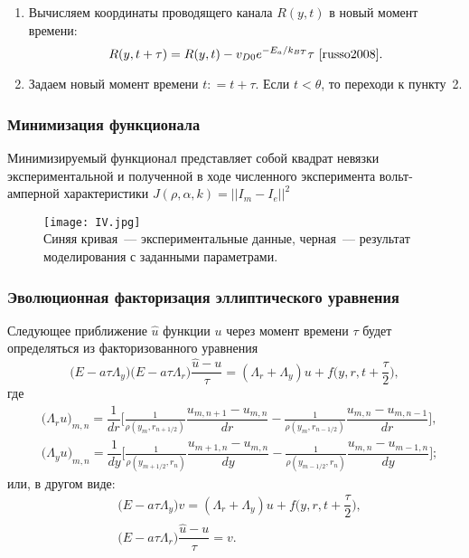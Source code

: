 \documentclass{beamer}
\begin{document}
\begin{frame}[allowframebreaks]
\begin{enumerate}
    \item Вычисляем координаты проводящего канала $R(y,t)$ в новый момент времени:
        \begin{equation*}
            R(y,t + \tau) = R(y,t) - v_{D0} e^{-E_a/{k}_{BT}} \tau~\cite{russo2008}.
        \end{equation*}

    \item Задаем новый момент времени $t: = t + \tau$. Если $t < \theta$, то переходи к пункту~2.

    \end{enumerate}
\end{frame}

\begin{frame}
    \frametitle{Минимизация функционала}
    Минимизируемый функционал представляет собой квадрат невязки экспериментальной и полученной в ходе численного эксперимента вольт-амперной характеристики $ J(\rho,\alpha,k) = || I_m - I_e||^2 $
    \begin{figure}
        \texttt{[image: IV.jpg]}
        \\ Синяя кривая~--- экспериментальные данные, черная~--- результат моделирования с заданными параметрами.
    \end{figure}
\end{frame}

\begin{frame}
    \frametitle{Эволюционная факторизация эллиптического уравнения}

    Следующее приближение $\hat{u}$ функции $u$ через момент времени $\tau$ будет определяться из  факторизованного уравнения~\cite{kalitkin}
    \begin{equation*}
        \Big(E - a\tau \Lambda_y\Big)\Big(E - a \tau \Lambda_r\Big)\dfrac{\hat{u} - u}{\tau} = (\Lambda_r + \Lambda_y) u + f\Big(y,r,t+\dfrac{\tau}{2}\Big),
    \end{equation*}
    где
    \begin{align*} &{\Big(\Lambda_r u\Big)}_{m,n} = \dfrac{1}{dr}\bigg[\frac{1}{\rho(y_{m},r_{n + 1/2})}\dfrac{u_{m,n + 1} - u_{m,n}}{dr} - \frac{1}{\rho(y_{m},r_{n - 1/2})}\dfrac{u_{m,n} - u_{m,n - 1}}{dr}\bigg], \\
    &{\Big(\Lambda_y u\Big)}_{m,n} = \dfrac{1}{dy}\bigg[\frac{1}{\rho(y_{m + 1/2},r_{n})}\dfrac{u_{m + 1,n} - u_{m,n}}{dy} - \frac{1}{\rho(y_{m - 1/2},r_{n})}\dfrac{u_{m,n} - u_{m - 1,n}}{dy}\bigg];
\end{align*}
или, в другом виде:
\begin{align*}
    &\Big(E - a\tau \Lambda_y\Big)v = (\Lambda_r + \Lambda_y) u + f\Big(y,r,t+\dfrac{\tau}{2}\Big), \\
    &\Big(E - a \tau \Lambda_r\Big)\dfrac{\hat{u} - u}{\tau} = v.
\end{align*}

\end{frame}
\end{document}
